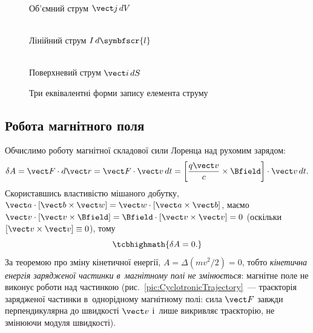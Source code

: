 \begin{figure}[h!]
	\centering
	\begin{minipage}[t]{0.32\linewidth}\centering
		\\
		\footnotesize Об'ємний струм $\vect j\, dV$
	\end{minipage}\hfill
	\begin{minipage}[t]{0.32\linewidth}\centering
		\\
		\footnotesize Лінійний струм $I\, d\symbfscr{l}$
	\end{minipage}\hfill
	\begin{minipage}[t]{0.32\linewidth}\centering
		\\
		\footnotesize Поверхневий струм $\vect i\, dS$
	\end{minipage}
	\caption{Три еквівалентні форми запису елемента струму\label{pic:CurrentElementTypes}}
\end{figure}


\subsection*{Робота магнітного поля}


Обчислимо роботу магнітної складової сили Лоренца над рухомим зарядом:
\begin{equation*}
	\delta A = \vect F\cdot d\vect r = \vect F\cdot \vect v\, dt = \left[\frac{q\vect v}{c}\times\Bfield\right]\cdot \vect v\, dt.
\end{equation*}
Скориставшись властивістю мішаного добутку, $\vect a\cdot[\vect b\times\vect w] = \vect
	w\cdot[\vect a\times\vect b]$, маємо $\vect v\cdot\left[\vect v\times\Bfield\right] =
	\Bfield\cdot\left[\vect v\times\vect v\right] = 0$ (оскільки $\left[\vect v\times\vect
		v\right]\equiv 0$), тому
\begin{equation}\label{eq:WorkMagnetic}
	\tcbhighmath{
		\delta A = 0.
	}
\end{equation}
За теоремою про зміну кінетичної енергії, $A = \Delta\left(mv^2/2\right) = 0$, тобто
\emph{кінетична енергія зарядженої частинки в~магнітному полі не змінюється}: магнітне
поле не виконує роботи над частинкою (рис.~\ref{pic:CyclotronicTrajectory}~--- траєкторія
зарядженої частинки в~однорідному магнітному полі: сила $\vect F$ завжди перпендикулярна
до швидкості $\vect v$ і~лише викривляє траєкторію, не змінюючи модуля швидкості).

